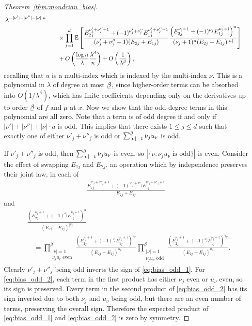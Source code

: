 \begin{proof}[Theorem~\ref{thm:mondrian_bias}]
\begin{align}
    \, \lambda^{- |\nu'| - |\nu''| - |\nu| \cdot u} \\
    \nonumber
    &\qquad\times
    \prod_{j=1}^d
    \mathbb{E} \left[
      \frac{E_{2j}^{\nu'_j + \nu''_j + 1}
      + (-1)^{\nu'_j + \nu''_j} E_{1j}^{\nu'_j + \nu''_j + 1}}
      {(\nu'_j + \nu''_j + 1) (E_{2j} + E_{1j})}
      \frac{\left(E_{2j}^{\nu_j + 1}
      + (-1)^{\nu_j} E_{1j}^{\nu_j + 1}\right)^u}
      {(\nu_j + 1)^u (E_{2j} + E_{1j})^{|u|}}
    \right] \\
    \label{eq:bias}
    &\qquad+
    O \left( \frac{\log n}{\lambda} \frac{\lambda^d}{n} \right)
    + O \left( \frac{1}{\lambda^\beta} \right),
  \end{align}
  recalling that $u$ is a multi-index which is indexed by the multi-index $\nu$.
  This is a polynomial in $\lambda$ of degree at most $\flbeta$,
  since higher-order terms can be absorbed into $O(1 / \lambda^\beta)$,
  which has finite coefficients depending only on
  the derivatives up to order $\flbeta$ of $f$ and $\mu$ at $x$.
  Now we show that the odd-degree terms in this polynomial are all zero.
  Note that a term is of odd degree if and only if
  $|\nu'| + |\nu''| + |\nu| \cdot u$ is odd.
  This implies that there exists $1 \leq j \leq d$ such that
  exactly one of either
  $\nu'_j + \nu''_j$ is odd or
  $\sum_{|\nu|=1}^{\flbeta} \nu_j u_\nu$ is odd.

  If $\nu'_j + \nu''_j$ is odd, then
  $\sum_{|\nu|=1}^{\flbeta} \nu_j u_\nu$ is even, so
  $|\{\nu : \nu_j u_\nu \text{ is odd}\}|$ is even.
  Consider the effect of swapping $E_{1j}$ and $E_{2j}$,
  an operation which by independence preserves their joint law,
  in each of
  \begin{align}
    \label{eq:bias_odd_1}
    \frac{E_{2j}^{\nu'_j + \nu''_j + 1}
    + (-1)^{\nu'_j + \nu''_j} E_{1j}^{\nu'_j + \nu''_j + 1}}
    {E_{2j} + E_{1j}}
  \end{align}
  and
  \begin{align}
    \nonumber
    &\frac{\left(E_{2j}^{\nu_j + 1}
    + (-1)^{\nu_j} E_{1j}^{\nu_j + 1}\right)^u}
    {(E_{2j} + E_{1j})^{|u|}} \\
    \label{eq:bias_odd_2}
    &\quad=
    \prod_{\substack{|\nu| = 1 \\
    \nu_j u_\nu \text{ even}}}^\beta
    \frac{\left(E_{2j}^{\nu_j + 1}
    + (-1)^{\nu_j} E_{1j}^{\nu_j + 1}\right)^{u_\nu}}
    {(E_{2j} + E_{1j})^{u_\nu}}
    \prod_{\substack{|\nu| = 1 \\
    \nu_j u_\nu \text{ odd}}}^\beta
    \frac{\left(E_{2j}^{\nu_j + 1}
    + (-1)^{\nu_j} E_{1j}^{\nu_j + 1}\right)^{u_\nu}}
    {(E_{2j} + E_{1j})^{u_\nu}}.
  \end{align}
  Clearly $\nu'_j + \nu''_j$ being odd inverts the
  sign of \eqref{eq:bias_odd_1}.
  For \eqref{eq:bias_odd_2},
  each term in the first product has either
  $\nu_j$ even or $u_\nu$ even, so its sign is preserved.
  Every term in the second product of \eqref{eq:bias_odd_2}
  has its sign inverted due to both $\nu_j$ and $u_\nu$ being odd,
  but there are an even number of terms,
  preserving the overall sign.
  Therefore the expected product
  of \eqref{eq:bias_odd_1} and \eqref{eq:bias_odd_2} is zero by symmetry.


\end{proof}
